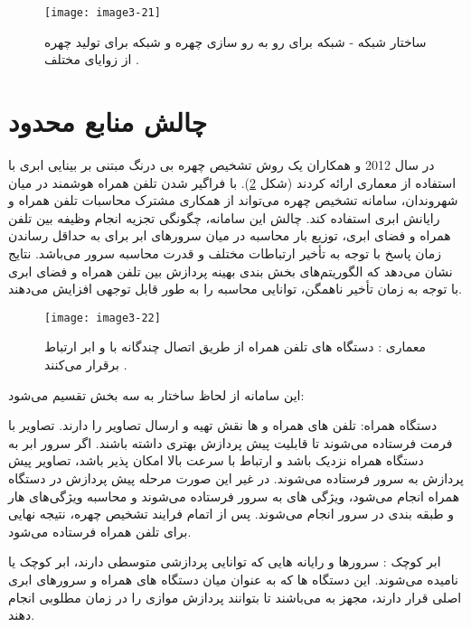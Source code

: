 \begin{figure}[h]
\centering
  \texttt{[image: image3-21]}
  \caption{ساختار شبکه  - شبکه  برای رو به رو سازی چهره و شبکه  برای تولید چهره از زوایای مختلف \cite{8603840}.}
  \label{image3-21}
\end{figure}
 
\section{چالش منابع محدود}
در سال 2012  و همکاران \cite{6249269} یک روش تشخیص چهره بی درنگ مبتنی بر بینایی ابری  با استفاده از معماری   ارائه کردند (شکل \ref{image3-22}). با فراگیر شدن تلفن همراه هوشمند در میان شهروندان، سامانه تشخیص چهره می‌تواند از همکاری مشترک محاسبات تلفن همراه و رایانش ابری استفاده کند. چالش این سامانه، چگونگی تجزیه انجام وظیفه بین تلفن همراه و فضای ابری، توزیع بار محاسبه در میان سرورهای ابر برای به حداقل رساندن زمان پاسخ با توجه به تأخیر ارتباطات مختلف و قدرت محاسبه سرور می‌باشد. نتایج نشان می‌دهد که الگوریتم‌های بخش بندی بهینه پردازش بین تلفن همراه و فضای ابری با توجه به زمان تأخیر ناهمگن، توانایی محاسبه را به طور قابل توجهی افزایش می‌دهند. 

\begin{figure}[h]
\centering
  \texttt{[image: image3-22]}
  \caption{معماری : دستگاه های تلفن همراه از طریق اتصال چندگانه با  و ابر ارتباط برقرار می‌کنند \cite{6249269}.}
  \label{image3-22}
\end{figure}

\noindent
این سامانه از لحاظ ساختار به سه بخش تقسیم می‌شود:

\noindent
دستگاه همراه: تلفن های همراه و  ها نقش تهیه و ارسال تصاویر را دارند. تصاویر با فرمت  فرستاده می‌شوند تا قابلیت پیش پردازش بهتری داشته باشند. اگر سرور ابر به دستگاه همراه نزدیک باشد و ارتباط با سرعت بالا امکان پذیر باشد، تصاویر پیش پردازش به سرور فرستاده می‌شوند. در غیر این صورت مرحله پیش پردازش در دستگاه همراه انجام می‌شود، ویژگی های  به سرور فرستاده می‌شوند و محاسبه ویژگی‌های هار و طبقه بندی در سرور انجام می‌شوند. پس از اتمام فرایند تشخیص چهره، نتیجه نهایی برای تلفن همراه فرستاده می‌شود.

\noindent
ابر کوچک : سرورها و رایانه هایی که توانایی پردازشی متوسطی دارند، ابر کوچک یا  نامیده می‌شوند. این دستگاه ها که به عنوان میان دستگاه های همراه و سرورهای ابری اصلی قرار دارند، مجهز به  می‌باشند تا بتوانند پردازش موازی را در زمان مطلوبی انجام دهند.

